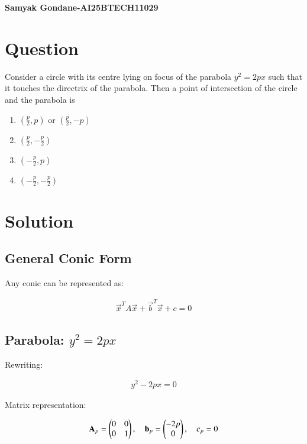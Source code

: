\documentclass{article}
\begin{document}
\begin{center}
\large
    \textbf{Samyak Gondane-AI25BTECH11029}
\end{center}
\date{}

\section*{Question}
Consider a circle with its centre lying on focus of the parabola $y^2 = 2px$ such that it touches the directrix of the parabola. Then a point of intersection of the circle and the parabola is

\begin{multicols}{2}
\begin{enumerate}
    \item $(\frac{p}{2}, p)$ or $(\frac{p}{2}, -p)$
    \item $(\frac{p}{2}, -\frac{p}{2})$
    \item $(-\frac{p}{2}, p)$
    \item $(-\frac{p}{2}, -\frac{p}{2})$
\end{enumerate}
\end{multicols}

\section*{Solution}

\subsection*{General Conic Form}

Any conic can be represented as:


\begin{align}
\vec{x}^T A \vec{x} + \vec{b}^T \vec{x} + c = 0
\end{align}



\subsection*{Parabola: $y^2 = 2px$}

Rewriting:


\begin{align}
y^2 - 2px = 0
\end{align}



Matrix representation:


\begin{align}
\mathbf{A}_p = \begin{pmatrix}0 & 0 \\ 0 & 1\end{pmatrix}, \quad
\mathbf{b}_p = \begin{pmatrix}-2p \\ 0\end{pmatrix}, \quad
c_p = 0
\end{align}
\end{document}
